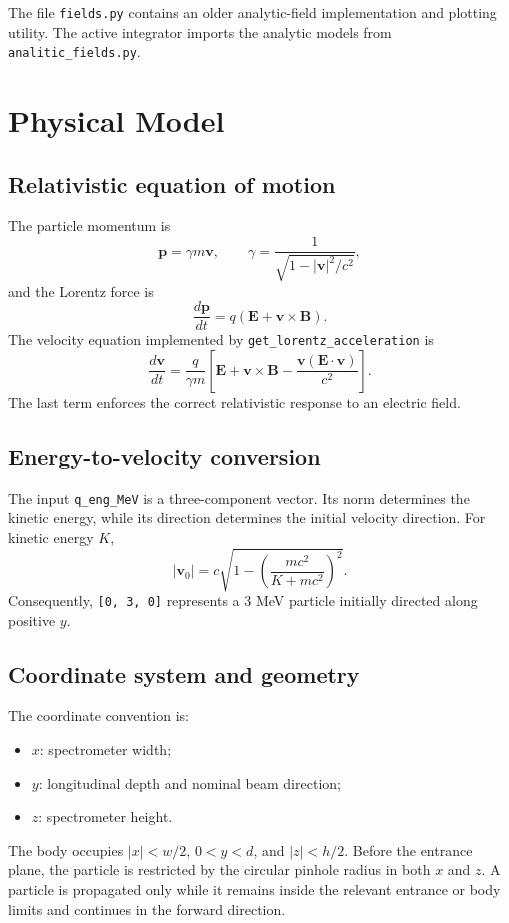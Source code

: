 \documentclass[11pt,a4paper]{report}
\newcommand{\code}[1]{\texttt{#1}}
\newcommand{\vect}[1]{\bm{#1}}
\begin{document}
The file \code{fields.py} contains an older analytic-field implementation and
plotting utility.  The active integrator imports the analytic models from
\code{analitic\_fields.py}.

\chapter{Physical Model}

\section{Relativistic equation of motion}
The particle momentum is
\begin{equation}
  \vect{p}=\gamma m\vect{v}, \qquad
  \gamma=\frac{1}{\sqrt{1-|\vect{v}|^2/c^2}},
\end{equation}
and the Lorentz force is
\begin{equation}
  \frac{d\vect{p}}{dt}=q\left(\vect{E}+\vect{v}\times\vect{B}\right).
\end{equation}
The velocity equation implemented by \code{get\_lorentz\_acceleration} is
\begin{equation}
  \frac{d\vect{v}}{dt}=\frac{q}{\gamma m}
  \left[
  \vect{E}+\vect{v}\times\vect{B}
  -\frac{\vect{v}(\vect{E}\cdot\vect{v})}{c^2}
  \right].
\end{equation}
The last term enforces the correct relativistic response to an electric field.

\section{Energy-to-velocity conversion}
The input \code{q\_eng\_MeV} is a three-component vector.  Its norm determines
the kinetic energy, while its direction determines the initial velocity
direction.  For kinetic energy $K$,
\begin{equation}
  |\vect{v}_0|=c\sqrt{1-
  \left(\frac{mc^2}{K+mc^2}\right)^2}.
\end{equation}
Consequently, \code{[0, 3, 0]} represents a 3 MeV particle initially directed
along positive $y$.

\section{Coordinate system and geometry}
The coordinate convention is:
\begin{itemize}[noitemsep]
  \item $x$: spectrometer width;
  \item $y$: longitudinal depth and nominal beam direction;
  \item $z$: spectrometer height.
\end{itemize}
The body occupies $|x|<w/2$, $0<y<d$, and $|z|<h/2$.  Before the entrance
plane, the particle is restricted by the circular pinhole radius in both $x$
and $z$.  A particle is propagated only while it remains inside the relevant
entrance or body limits and continues in the forward direction.
\end{document}
